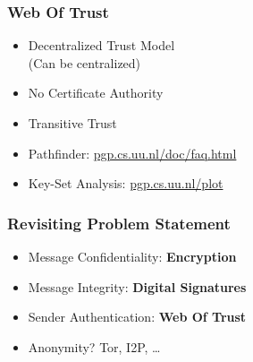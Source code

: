 \documentclass{beamer}
\begin{document}



\begin{frame}


	\frametitle{Web Of Trust}

	\begin{itemize}
		\item Decentralized Trust Model \\ (Can be centralized)
		\item No Certificate Authority
		\item Transitive Trust
	\end{itemize}	
	
	\begin{itemize}
		\item Pathfinder:          \url{pgp.cs.uu.nl/doc/faq.html}
		\item Key-Set Analysis: \url{pgp.cs.uu.nl/plot}
	\end{itemize}

\end{frame}


\begin{frame}
	\frametitle{Revisiting Problem Statement}

	\begin{itemize}
		\item Message Confidentiality: \textbf{Encryption} 
		\item Message Integrity:          \textbf{Digital Signatures} 
		\item Sender Authentication:    	\textbf{Web Of Trust}
		\item Anonymity? Tor, I2P, \ldots
	\end{itemize}


\end{frame}
\end{document}
